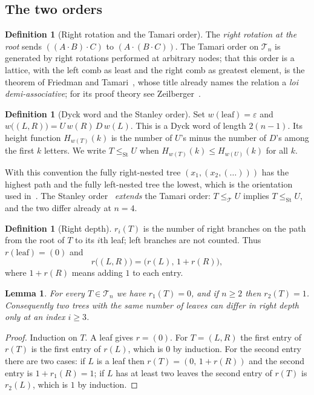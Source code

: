 \documentclass[11pt,a4paper]{article}
\theoremstyle{plain}
\newtheorem{lemma}[theorem]{Lemma}
\theoremstyle{definition}
\newtheorem{definition}[theorem]{Definition}
\newcommand{\Tam}{\mathcal{T}}
\newcommand{\St}{\mathrm{St}}
\begin{document}
\subsection{The two orders}

\begin{definition}[Right rotation and the Tamari order]\label{def:rot}
The \emph{right rotation at the root} sends $((A\cdot B)\cdot C)$ to
$(A\cdot(B\cdot C))$. The Tamari order on $\Tam_n$ is generated by right
rotations performed at arbitrary nodes; that this order is a lattice, with the left
comb as least and the right comb as greatest element, is the theorem of Friedman and
Tamari~\cite{FT}, whose title already names the relation a \emph{loi
demi-associative}; for its proof theory see Zeilberger~\cite{Zeil}.
\end{definition}

\begin{definition}[Dyck word and the Stanley order]\label{def:dyck}
Set $w(\text{leaf})=\varepsilon$ and $w\bigl((L,R)\bigr)=U\,w(R)\,D\,w(L)$. This is a
Dyck word of length $2(n-1)$. Its height function $H_{w(T)}(k)$ is the number of $U$'s
minus the number of $D$'s among the first $k$ letters. We write $T\le_{\St}U$ when
$H_{w(T)}(k)\le H_{w(U)}(k)$ for all $k$.
\end{definition}

With this convention the fully right-nested tree $(x_1,(x_2,(\dots)))$ has the highest
path and the fully left-nested tree the lowest, which is the orientation used
in~\cite{MO}. The Stanley order~\cite{Sta} \emph{extends} the Tamari order: $T\le_{\Tam}U$ implies
$T\le_{\St}U$, and the two differ already at $n=4$.

\begin{definition}[Right depth]\label{def:rdepth}
$r_i(T)$ is the number of right branches on the path from the root of $T$ to its $i$th
leaf; left branches are not counted. Thus $r(\text{leaf})=(0)$ and
\[
  r\bigl((L,R)\bigr)=\bigl(r(L),\,1+r(R)\bigr),
\]
where $1+r(R)$ means adding $1$ to each entry.
\end{definition}

\begin{lemma}\label{lem:r12}
For every $T\in\Tam_n$ we have $r_1(T)=0$, and if $n\ge2$ then $r_2(T)=1$. Consequently
two trees with the same number of leaves can differ in right depth only at an index
$i\ge3$.
\end{lemma}

\begin{proof}
Induction on $T$. A leaf gives $r=(0)$. For $T=(L,R)$ the first entry of $r(T)$ is the
first entry of $r(L)$, which is $0$ by induction. For the second entry there are two
cases: if $L$ is a leaf then $r(T)=(0,\,1+r(R))$ and the second entry is
$1+r_1(R)=1$; if $L$ has at least two leaves the second entry of $r(T)$ is $r_2(L)$,
which is $1$ by induction.
\end{proof}
\end{document}
